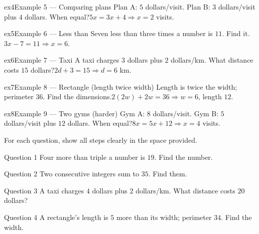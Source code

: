 \documentclass[11pt]{article}
\begin{document}
\begin{example}{ex4}{Example 5 --- Comparing plans}
Plan A: $5$ dollars/visit. Plan B: $3$ dollars/visit plus $4$ dollars. When equal?\soln $5x=3x+4\Rightarrow x=2$ visits.
\end{example}

\begin{example}{ex5}{Example 6 --- Less than}
Seven less than three times a number is $11$. Find it.\soln $3x-7=11\Rightarrow x=6$.
\end{example}

\begin{example}{ex6}{Example 7 --- Taxi}
A taxi charges $3$ dollars plus $2$ dollars/km. What distance costs $15$ dollars?\soln $2d+3=15\Rightarrow d=6$ km.
\end{example}

\begin{example}{ex7}{Example 8 --- Rectangle (length twice width)}
Length is twice the width; perimeter $36$. Find the dimensions.\soln $2(2w)+2w=36\Rightarrow w=6$, length $12$.
\end{example}

\begin{example}{ex8}{Example 9 --- Two gyms (harder)}
Gym A: $8$ dollars/visit. Gym B: $5$ dollars/visit plus $12$ dollars. When equal?\soln $8x=5x+12\Rightarrow x=4$ visits.
\end{example}

\clearpage
{}
For each question, show all steps clearly in the space provided.

\begin{qbox}{Question 1}
Four more than triple a number is $19$. Find the number.\workspace{2.2cm}
\end{qbox}

\begin{qbox}{Question 2}
Two consecutive integers sum to $35$. Find them.\workspace{2.2cm}
\end{qbox}

\begin{qbox}{Question 3}
A taxi charges $4$ dollars plus $2$ dollars/km. What distance costs $20$ dollars?\workspace{2.4cm}
\end{qbox}

\begin{qbox}{Question 4}
A rectangle's length is $5$ more than its width; perimeter $34$. Find the width.\workspace{2.4cm}
\end{qbox}
\end{document}
